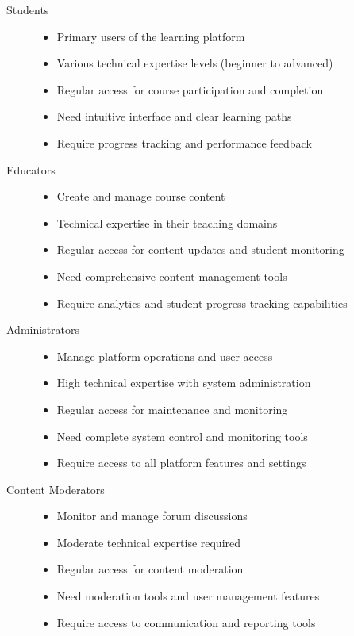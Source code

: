 \documentclass[a4paper, 11pt]{scrreprt}
\begin{document}
\begin{description}
    \item[Students]
        \begin{itemize}
            \item Primary users of the learning platform
            \item Various technical expertise levels (beginner to advanced)
            \item Regular access for course participation and completion
            \item Need intuitive interface and clear learning paths
            \item Require progress tracking and performance feedback
        \end{itemize}
    
    \item[Educators]
        \begin{itemize}
            \item Create and manage course content
            \item Technical expertise in their teaching domains
            \item Regular access for content updates and student monitoring
            \item Need comprehensive content management tools
            \item Require analytics and student progress tracking capabilities
        \end{itemize}
    
    \item[Administrators]
        \begin{itemize}
            \item Manage platform operations and user access
            \item High technical expertise with system administration
            \item Regular access for maintenance and monitoring
            \item Need complete system control and monitoring tools
            \item Require access to all platform features and settings
        \end{itemize}
    
    \item[Content Moderators]
        \begin{itemize}
            \item Monitor and manage forum discussions
            \item Moderate technical expertise required
            \item Regular access for content moderation
            \item Need moderation tools and user management features
            \item Require access to communication and reporting tools
        \end{itemize}
\end{description}
\end{document}
